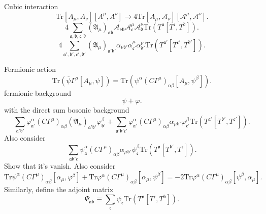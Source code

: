 
Cubic interaction
\[
	\mathrm{Tr}[A_\mu,A_\nu][A^\mu,A^\nu] \to 
	4 \mathrm{Tr}[A_\mu,\mathscr{A}_\nu][\mathscr{A}^\mu,\mathscr{A}^\nu]
.\] 
\[
	4 \sum_{\mathfrak{a},\mathfrak{b},\mathfrak{c},\mathfrak{d}}
	(\mathfrak{A}_\mu)_{\mathfrak{a}\mathfrak{b}}
	\mathscr{A}_{\nu \mathfrak{b}} \mathscr{A}^\mu_{\mathfrak{c}}
	\mathscr{A}^\nu_{\mathfrak{d}}
	\mathrm{Tr}(T^{\mathfrak{a}}[T^{\mathfrak{c}},T^{\mathfrak{d}}])
.\] 
\[
	4 \sum_{\mathfrak{a}',\mathfrak{b}',\mathfrak{c}',\mathfrak{d}'}
	(\mathfrak{A}_\mu)_{\mathfrak{a}'\mathfrak{b}'}
	\alpha_{\nu \mathfrak{b}'} \alpha^\mu_{\mathfrak{c}'}
	\alpha^\nu_{\mathfrak{d}'}
	\mathrm{Tr}(T^{\mathfrak{a}'}[T^{\mathfrak{c}'},T^{\mathfrak{d}'}])
.\] 

Fermionic action
\[
	\mathrm{Tr}( \overline{\psi} \Gamma^\mu[A_\mu,\psi])
	= \mathrm{Tr}( \psi^\alpha (C\Gamma^\mu)_{\alpha\beta}
	[A_\mu,\psi^\beta])
.\] 
fermionic background 
\[
\psi + \varphi
.\] 
with the direct sum bosonic background
\[
	\sum_{\mathfrak{a}' \mathfrak{b}'}
	\varphi^\alpha_{\mathfrak{a}'}  (C\Gamma^\mu)_{\alpha\beta}
	(\mathfrak{A}_\mu)_{\mathfrak{a}' \mathfrak{b}'}
	\varphi^\beta_{\mathfrak{b}'}
	+\sum_{\mathfrak{a}' \mathfrak{b}' \mathfrak{c}'}
	\varphi^\alpha_{\mathfrak{a}'}  (C\Gamma^\mu)_{\alpha\beta}
	\alpha_{\mu \mathfrak{b}'} \varphi^\beta_{\mathfrak{c}'}
	\mathrm{Tr}(T^{\mathfrak{a}'}[T^{\mathfrak{b}'},T^{\mathfrak{c}'}])
.\] 
Also consider
\[
	\sum_{\mathfrak{a} \mathfrak{b}' \mathfrak{c}}
		\psi^\alpha_{\mathfrak{a}}  (C\Gamma^\mu)_{\alpha\beta}
			\alpha_{\mu \mathfrak{b}'} \psi^\beta_{\mathfrak{c}}
				\mathrm{Tr}(T^{\mathfrak{a}}[T^{\mathfrak{b}'},T^{\mathfrak{c}}])
.\] 
Show that it's vanish.
Also consider
\[
	\mathrm{Tr} \psi^\alpha (C\Gamma^\mu)_{\alpha\beta} 
	[\alpha_\mu,\varphi^\beta]
	+ \mathrm{Tr} \varphi^\alpha (C\Gamma^\mu)_{\alpha\beta}
	[\alpha_\mu,\psi^\beta]
	= - 2 \mathrm{Tr} \varphi^\alpha (C\Gamma^\mu)_{\alpha\beta}
	[\psi^\beta,\alpha_\mu]
.\] 
Similarly, define the adjoint matrix
\[
	\Psi_{\mathfrak{a}\mathfrak{b}} \equiv
	\sum_{\mathfrak{c}} \psi_{\mathfrak{c}} 
	\mathrm{Tr} ( T^{\mathfrak{a}} [T^{\mathfrak{c}},T^{\mathfrak{b}}])
.\] 
